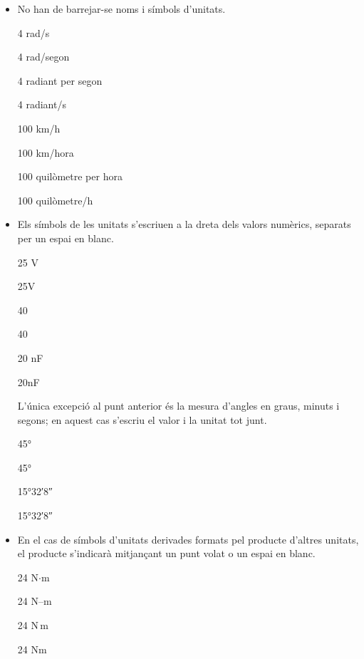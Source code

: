 \begin{itemize}
\item No han de barrejar-se noms i símbols d'unitats.

\textcolor{Green}\faCheckSquare{} 4 rad/s

\textcolor{Red}\faTimesCircle{} 4 rad/segon

\textcolor{Green}\faCheckSquare{} 4 radiant per segon

\textcolor{Red}\faTimesCircle{} 4 radiant/s

\textcolor{Green}\faCheckSquare{} 100 km/h

\textcolor{Red}\faTimesCircle{} 100 km/hora

\textcolor{Green}\faCheckSquare{} 100 quilòmetre per hora

\textcolor{Red}\faTimesCircle{} 100 quilòmetre/h


\item Els símbols de les unitats s'escriuen a la dreta dels valors
numèrics, separats per un espai en blanc.

\textcolor{Green}\faCheckSquare{} 25 V

\textcolor{Red}\faTimesCircle{} 25V

\textcolor{Green}\faCheckSquare{} 40 \celsius

\textcolor{Red}\faTimesCircle{} 40\celsius

\textcolor{Green}\faCheckSquare{} 20 nF

\textcolor{Red}\faTimesCircle{} 20nF


 L'única excepció al punt anterior és la mesura d'angles en graus, minuts i segons; en aquest cas s'escriu el valor i la unitat tot junt.

\textcolor{Green}\faCheckSquare{} \ang{45}

\textcolor{Red}\faTimesCircle{} \ang[number-angle-product = \,]{45}

\textcolor{Green}\faCheckSquare{} \ang{15;32;8}

\textcolor{Red}\faTimesCircle{} \ang[number-angle-product = \,]{15;32;8}

\item En el cas de símbols d'unitats derivades formats pel producte
d'altres unitats, el producte s'indicarà mitjançant un punt volat o
un espai en blanc.

\textcolor{Green}\faCheckSquare{} 24 N$\cdot$m

\textcolor{Red}\faTimesCircle{} 24 N--m

\textcolor{Green}\faCheckSquare{} 24 N\,m

\textcolor{Red}\faTimesCircle{} 24 Nm


\end{itemize}
